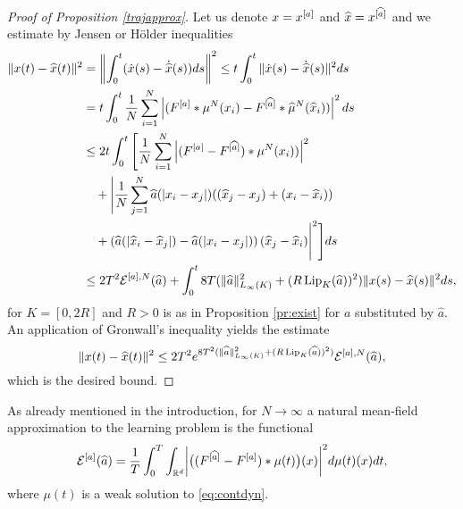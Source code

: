 \begin{proof}[Proof of Proposition \ref{trajapprox}]
Let us denote $x=x^{[a]} $ and $\widehat x =x^{[\widehat a]}  $ and we estimate by Jensen or H\"older inequalities
\begin{align*}
\|x(t) - \widehat x(t) \|^2 & = \left \| \int_0^t ( \dot x(s) - \dot{\widehat x}(s)) ds \right \|^2 \leq  t \int_0^t \| \dot x(s) - \dot{\widehat x}(s) \|^2 ds \\
&=  t \int_0^t \frac{1}{N} \sum_{i=1}^N \left | (F^{[a]} * \mu^N(x_i)- F^{[\widehat a]} * \widehat \mu^N(\widehat x_i)) \right |^2 ds\\
&\leq 2 t \int_0^t \Bigg[  \frac{1}{N} \sum_{i=1}^N \left| (F^{[a]} - F^{[\widehat a]}) *  \mu^N( x_i)) \right |^2 \\
&\quad +\Bigg| \frac{1}{N} \sum_{j=1}^N \widehat a(|x_i-x_j|)( (\widehat x_j - x_j) + (x_i-\widehat x_i))  \\
&\quad+ \left(\widehat a(| \widehat x_i-\widehat x_j|) -  \widehat a(| x_i- x_j |)\right) (\widehat x_j - \widehat x_i) \Bigg|^2  \Bigg ] ds \\
&\leq 2 T^2 \mathcal E^{[a],N}(\widehat a) +  \int_0^t 8 T( \|\widehat a\|_{L_\infty(K)}^2 + (R \operatorname{Lip}_K(\widehat a) ) ^2 )\|x(s) - \widehat x(s) \|^2  ds,
\end{align*}
for $K=[0,2 R]$ and $R>0$ is as in Proposition \ref{pr:exist} for $a$ substituted by $\widehat a$.
An application of Gronwall's inequality yields the estimate
$$
\|x(t) - \widehat x(t) \|^2 \leq 2 T^2   e^{8 T^2( \|\widehat a\|_{L_\infty(K)}^2 + (R \operatorname{Lip}_K(\widehat a) ) ^2)} \mathcal E^{[a],N}(\widehat a),
$$
which is the desired bound.
\end{proof}
As already mentioned in the introduction, for $N \to \infty$ a natural mean-field approximation to the learning problem is the functional
\begin{align*}
	\mathcal E^{[a]}(\widehat a)=\frac{1}{T}\int_0^T \int_{\mathbb{R}^d} \biggl|\bigl((F^{[\widehat a]}-F^{[a]})\ast\mu(t)\bigr)(x)\biggr|^2d\mu(t)(x)dt,
\end{align*}
where $\mu(t)$ is a weak solution to \eqref{eq:contdyn}. 

